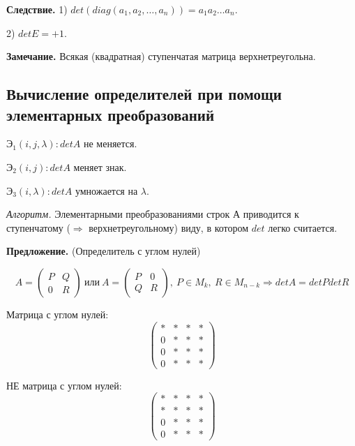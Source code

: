 \vspace{\baselineskip}
\textbf{Следствие.} 1) $det(diag(a_1, a_2, \dots, a_n)) = a_1 a_2 \dots a_n$.

2) $detE = +1$.

\vspace{\baselineskip}
\textbf{Замечание.} Всякая (квадратная) ступенчатая матрица верхнетреугольна.

\vspace{\baselineskip}
\subsection{Вычисление определителей при помощи элементарных преобразований}

\vspace{\baselineskip}
$Э_1 (i, j, \lambda): detA$ не меняется.

$Э_2 (i, j): detA$ меняет знак.

$Э_3 (i, \lambda): detA$ умножается на $\lambda$.

\vspace{\baselineskip}
\textit{Алгоритм.} Элементарными преобразованиями строк А приводится к ступенчатому  ($\Rightarrow$ верхнетреугольному) виду, в котором $det$ легко считается.

\vspace{\baselineskip}
\textbf{Предложение.} (Определитель с углом нулей) 

\[ A = 
\left(
\begin{array}{c|c}
  P & Q \\
  \hline
  0 & R
\end{array}
\right) \ или \ A = 
\left(
\begin{array}{c|c}
  P & 0 \\
  \hline
  Q & R
\end{array}
\right),\ P \in M_k, \ R \in M_{n-k} \Rightarrow detA = detP detR
\]

Матрица с углом нулей:
\[ 
\left(
\begin{array}{c|ccc}
  * & * & * & * \\
  \hline
  0 & * & * & * \\
  0 & * & * & * \\
  0 & * & * & *
\end{array}
\right)
\]

НЕ матрица с углом нулей:
\[ 
\left(
\begin{array}{c|ccc}
  * & * & * & * \\
  * & * & * & * \\
  \hline
  0 & * & * & * \\
  0 & * & * & *
\end{array}
\right)
\]

